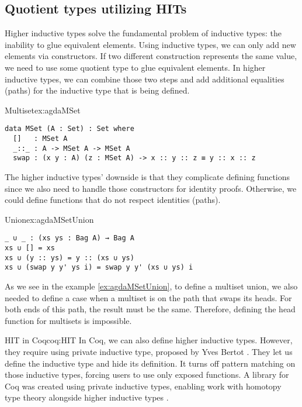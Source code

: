 \subsection{Quotient types utilizing HITs}
Higher inductive types solve the fundamental problem of inductive types: the inability to glue equivalent elements. Using inductive types, we can only add new elements via constructors. If two different construction represents the same value, we need to use some quotient type to glue equivalent elements. In higher inductive types, we can combine those two steps and add additional equalities (paths) for the inductive type that is being defined.
\begin{example}{Multiset}{ex:agdaMSet}
\begin{verbatim}
data MSet (A : Set) : Set where
  []   : MSet A
  _::_ : A -> MSet A -> MSet A 
  swap : (x y : A) (z : MSet A) -> x :: y :: z ≡ y :: x :: z
\end{verbatim}
\end{example}
The higher inductive types' downside is that they complicate defining functions since we also need to handle those constructors for identity proofs. Otherwise, we could define functions that do not respect identities (paths).
\begin{example}{Union}{ex:agdaMSetUnion}
\begin{verbatim}
_ ∪ _ : (xs ys : Bag A) → Bag A
xs ∪ [] = xs
xs ∪ (y :: ys) = y :: (xs ∪ ys)
xs ∪ (swap y y' ys i) = swap y y' (xs ∪ ys) i
\end{verbatim}
\end{example}
As we see in the example \ref{ex:agdaMSetUnion}, to define a multiset union, we also needed to define a case when a multiset is on the path that swaps its heads. For both ends of this path, the result must be the same. Therefore, defining the head function for multisets is impossible.
\begin{coq}{HIT in Coq}{coq:HIT}
In Coq, we can also define higher inductive types. However, they require using private inductive type, proposed by Yves Bertot \cite{PrivetInductive}. They let us define the inductive type and hide its definition. It turns off pattern matching on those inductive types, forcing users to use only exposed functions. A library for Coq was created using private inductive types, enabling work with homotopy type theory alongside higher inductive types \cite{HoTTinCoq}.
\end{coq}